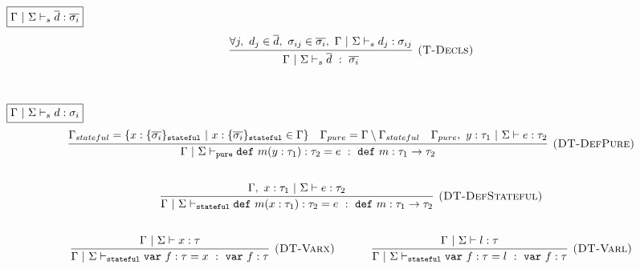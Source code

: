 \documentclass{llncs}
\newcommand{\keywadj}[1]{\mathtt{#1}}
\newcommand{\keyw}[1]{\keywadj{#1}~}
\begin{document}
$\fbox{$\Gamma~|~\Sigma \vdash_s \overline{d} : \overline{\sigma_i}$}$
\[
\begin{array}{c}
\infer[\textsc{(T-Decls)}]
  {\Gamma~|~\Sigma \vdash_{s} \overline{d}~:~\overline{\sigma_i}}
  {\forall j,~d_j \in \overline{d},~\sigma_{ij} \in \overline{\sigma_i},~\Gamma~|~\Sigma \vdash_{s} d_j : \sigma_{ij}}\\[5ex]

\end{array}
\]

$\fbox{$\Gamma~|~\Sigma \vdash_s d : \sigma_i$}$
\[
\begin{array}{c}


  
\infer[\textsc{(DT-DefPure)}]
  {\Gamma~|~\Sigma \vdash_{\keywadj{pure}} \keyw{def} m(y : \tau_1) : \tau_2 = e~:~\keyw{def} m : \tau_1 \rightarrow \tau_2}
  {\Gamma_{stateful} = \{x : \{ \overline{\sigma_i} \}_{\keywadj{stateful}} ~|~ x : \{ \overline{\sigma_i} \}_{\keywadj{stateful}} \in \Gamma\} & \Gamma_{pure} = \Gamma \setminus \Gamma_{stateful} & \Gamma_{pure},~y : \tau_1~|~\Sigma \vdash e : \tau_2}\\[5ex]

\infer[\textsc{(DT-DefStateful)}]
  {\Gamma~|~\Sigma \vdash_{\keywadj{stateful}} \keyw{def} m(x : \tau_1) : \tau_2 = e~:~\keyw{def} m : \tau_1 \rightarrow \tau_2}
  {\Gamma,~x : \tau_1~|~\Sigma \vdash e : \tau_2}\\[5ex]

\infer[\textsc{(DT-Varx)}]
  {\Gamma~|~\Sigma \vdash_{\keywadj{stateful}} \keyw{var} f : \tau = x~:~\keyw{var} f : \tau}
  {\Gamma~|~\Sigma \vdash x : \tau}%
~~~~~~~~~~
\infer[\textsc{(DT-Varl)}]
  {\Gamma~|~\Sigma \vdash_{\keywadj{stateful}} \keyw{var} f : \tau = l~:~\keyw{var} f : \tau}
  {\Gamma~|~\Sigma \vdash l : \tau}\\[5ex]

\end{array}
\]
\end{document}
